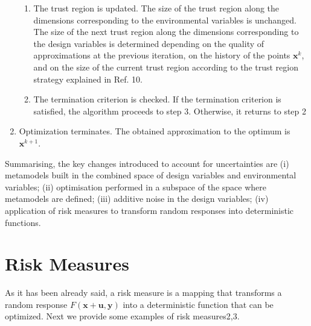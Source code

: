 \documentclass[10pt,twocolumn,a4paper]{article}
\begin{document}
\begin{enumerate}
\begin{enumerate}[label=(\alph*)]
    \item The trust region is updated. The size of the trust region along the dimensions corresponding to the environmental variables is unchanged. The size of the next trust region along the dimensions corresponding to the design variables is determined depending on the quality of approximations at the previous iteration, on the history of the points $\pmb x^k$, and on the size of the current trust region according to the trust region strategy explained in Ref. 10.
    \item The termination criterion is checked. If the termination criterion is satisfied, the algorithm proceeds to step 3. Otherwise, it returns to step 2
  \end{enumerate}
  \item Optimization terminates. The obtained approximation to the optimum is $\pmb x^{k+1}$.
\end{enumerate}

Summarising, the key changes introduced to account for uncertainties are (i) metamodels built in the combined space of design variables and environmental variables; (ii) optimisation performed in a subspace of the space where metamodels are defined; (iii) additive noise in the design variables; (iv) application of risk measures to transform random responses into deterministic functions.

\section{Risk Measures}
\label{sec:risk}

As it has been already said, a risk measure is a mapping that transforms a random response $F(\pmb x+ \pmb u,\pmb y)$  into a deterministic function that can be optimized. Next we provide some examples of risk measures2,3.
\end{document}
